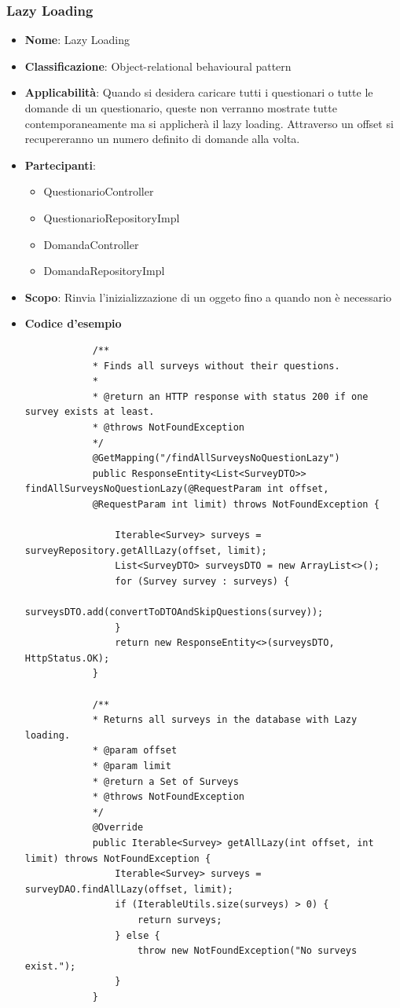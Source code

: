 \documentclass[12pt]{article}
\begin{document}
	\subsubsection{Lazy Loading}
	\begin{itemize}
		\item \textbf{Nome}: Lazy Loading
		\item \textbf{Classificazione}: Object-relational behavioural pattern
		\item \textbf{Applicabilità}: Quando si desidera caricare tutti i questionari o tutte le domande di un questionario, queste non verranno mostrate tutte contemporaneamente ma si applicherà il lazy loading. Attraverso un offset si recupereranno un numero definito di domande alla volta.
		\item \textbf{Partecipanti}:
		\begin{itemize}
			\item QuestionarioController
			\item QuestionarioRepositoryImpl
			\item DomandaController
			\item DomandaRepositoryImpl
		\end{itemize}
		\item \textbf{Scopo}: Rinvia l'inizializzazione di un oggeto fino a quando non è necessario
		\item \textbf{Codice d'esempio}
		\begin{lstlisting}
			/**
			* Finds all surveys without their questions.
			* 
			* @return an HTTP response with status 200 if one survey exists at least.
			* @throws NotFoundException
			*/
			@GetMapping("/findAllSurveysNoQuestionLazy")
			public ResponseEntity<List<SurveyDTO>> findAllSurveysNoQuestionLazy(@RequestParam int offset, 
			@RequestParam int limit) throws NotFoundException {
				
				Iterable<Survey> surveys = surveyRepository.getAllLazy(offset, limit);
				List<SurveyDTO> surveysDTO = new ArrayList<>();
				for (Survey survey : surveys) {
					surveysDTO.add(convertToDTOAndSkipQuestions(survey));
				}
				return new ResponseEntity<>(surveysDTO, HttpStatus.OK);
			}
			
			/**
			* Returns all surveys in the database with Lazy loading.
			* @param offset
			* @param limit
			* @return a Set of Surveys
			* @throws NotFoundException
			*/
			@Override
			public Iterable<Survey> getAllLazy(int offset, int limit) throws NotFoundException {
				Iterable<Survey> surveys = surveyDAO.findAllLazy(offset, limit);
				if (IterableUtils.size(surveys) > 0) {
					return surveys;
				} else {
					throw new NotFoundException("No surveys exist.");
				}
			}
		\end{lstlisting}
	\end{itemize}
\end{document}
